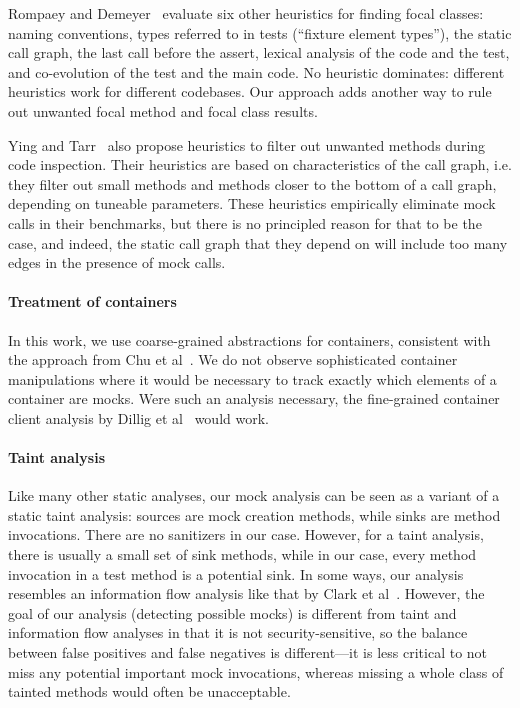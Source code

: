 Rompaey and Demeyer~\cite{rompaey09:_estab_traceab_links_unit_test} evaluate six other heuristics for finding focal classes: naming conventions, types referred to in tests (``fixture element types''), the static call graph, the last call before the assert, lexical analysis of the code and the test, and co-evolution of the test and the main code. No heuristic dominates: different heuristics work for different codebases. Our approach adds another way to rule out unwanted focal method and focal class results.

Ying and Tarr~\cite{DBLP:conf/eclipse/YingT07} also propose heuristics to filter out unwanted methods during code inspection. Their heuristics are based on characteristics of the call graph, i.e. they filter out small methods and methods closer to the bottom of a call graph, depending on tuneable parameters. These heuristics empirically eliminate mock calls in their benchmarks, but there is no principled reason for that to be the case, and indeed, the static call graph that they depend on will include too many edges in the presence of mock calls.

\paragraph{Treatment of containers} In this work, we use coarse-grained abstractions for containers, consistent with the approach from Chu et al~\cite{chu12:_collec_disjoin_analy}. We do not observe sophisticated container manipulations where it would be necessary to track exactly which elements of a container are mocks. Were such an analysis necessary, the fine-grained container client analysis by Dillig et al~\cite{dillig11:_precis_reason_progr_using_contain} would work.

\paragraph{Taint analysis} Like many other static analyses, our mock analysis can be seen as a variant of a static taint analysis: sources are mock creation methods, while sinks are method invocations. There are no sanitizers in our case. However, for a taint analysis, there is usually a small set of sink methods, while in our case, every method invocation in a test method is a potential sink. In some ways, our analysis resembles an information flow analysis like that by Clark et al~\cite{clark07:_static_analy_quant_infor_flow}. However, the goal of our analysis (detecting possible mocks) is different from taint and information flow analyses in that it is not security-sensitive, so the balance between false positives and false negatives is different---it is less critical to not miss any potential important mock invocations, whereas missing a whole class of tainted methods would often be unacceptable.


